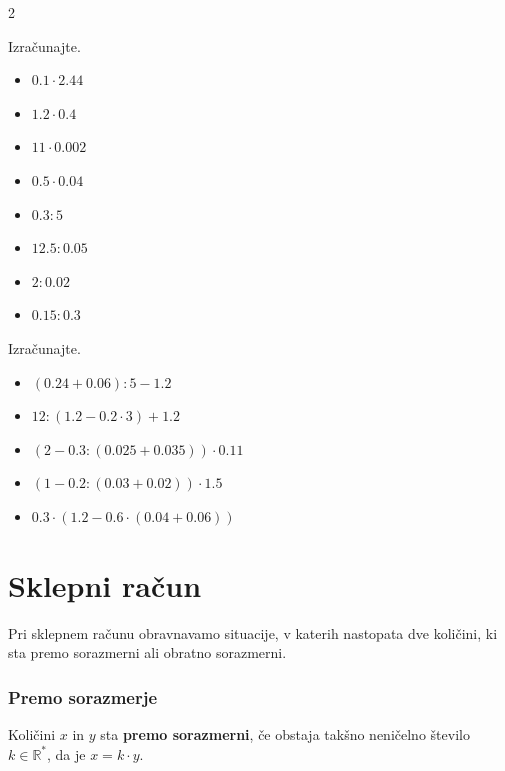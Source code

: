 \begin{multicols}{2}
    


    \begin{naloga}
        Izračunajte.
        \begin{itemize}
                    \item $0.1\cdot 2.44$ 
                    \item $1.2\cdot 0.4$ 
                    \item $11\cdot 0.002$ 
                    \item $0.5\cdot 0.04$ 
                    \item $0.3: 5$ 
                    \item $12.5: 0.05$ 
                    \item $2: 0.02$ 
                    \item $0.15: 0.3$ 
        \end{itemize}
    \end{naloga}

    


    \begin{naloga}
        Izračunajte.
        \begin{itemize}
                    \item $\left(0.24 + 0.06\right):5 - 1.2$ 
                    \item $12:\left(1.2- 0.2\cdot 3\right)+1.2$ 
                    \item $\left(2-0.3:\left(0.025 + 0.035\right)\right)\cdot 0.11$ 
                    \item $\left(1-0.2:\left(0.03+0.02\right)\right)\cdot 1.5$ 
                    \item $0.3\cdot\left(1.2-0.6\cdot\left(0.04+0.06\right)\right)$ 
        \end{itemize}
    \end{naloga}

        \end{multicols}


               
    \section{Sklepni račun}

    

        
            Pri sklepnem računu obravnavamo situacije, v katerih nastopata dve količini,
            ki sta premo sorazmerni ali obratno sorazmerni.
        

        \subsubsection*{Premo sorazmerje}
        Količini $x$ in $y$ sta \textbf{premo sorazmerni}, če obstaja takšno neničelno število $k\in\mathbb{R}^*$, da je $x=k\cdot y$.
        

